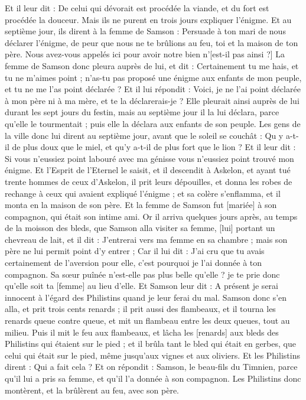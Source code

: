\begin{multicols}{2}
Et il leur dit : De celui qui dévorait est procédée la viande, et du fort est procédée la douceur. Mais ils ne purent en trois jours expliquer l'énigme.
Et au septième jour, ils dirent à la femme de Samson : Persuade à ton mari de nous déclarer l'énigme, de peur que nous ne te brûlions au feu, toi et la maison de ton père. Nous avez-vous appelés ici pour avoir notre bien n'[est-il pas ainsi ?]
La femme de Samson donc pleura auprès de lui, et dit : Certainement tu me hais, et tu ne m'aimes point ; n'as-tu pas proposé une énigme aux enfants de mon peuple, et tu ne me l'as point déclarée ? Et il lui répondit : Voici, je ne l'ai point déclarée à mon père ni à ma mère, et te la déclarerais-je ?
Elle pleurait ainsi auprès de lui durant les sept jours du festin, mais au septième jour il la lui déclara, parce qu'elle le tourmentait ; puis elle la déclara aux enfants de son peuple.
Les gens de la ville donc lui dirent au septième jour, avant que le soleil se couchât : Qu y a-t-il de plus doux que le miel, et qu'y a-t-il de plus fort que le lion ? Et il leur dit : Si vous n'eussiez point labouré avec ma génisse vous n'eussiez point trouvé mon énigme.
Et l'Esprit de l'Eternel le saisit, et il descendit à Askelon, et ayant tué trente hommes de ceux d'Askelon, il prit leurs dépouilles, et donna les robes de rechange à ceux qui avaient expliqué l'énigme ; et sa colère s'enflamma, et il monta en la maison de son père.
Et la femme de Samson fut [mariée] à son compagnon, qui était son intime ami.
\VerseOne{}Or il arriva quelques jours après, au temps de la moisson des bleds, que Samson alla visiter sa femme, [lui] portant un chevreau de lait, et il dit : J'entrerai vers ma femme en sa chambre ; mais son père ne lui permit point d'y entrer ;
Car il lui dit : J'ai cru que tu avais certainement de l'aversion pour elle, c'est pourquoi je l'ai donnée à ton compagnon. Sa sœur puînée n'est-elle pas plus belle qu'elle ? je te prie donc qu'elle soit ta [femme] au lieu d'elle.
Et Samson leur dit : A présent je serai innocent à l'égard des Philistins quand je leur ferai du mal.
Samson donc s'en alla, et prit trois cents renards ; il prit aussi des flambeaux, et il tourna les renards queue contre queue, et mit un flambeau entre les deux queues, tout au milieu.
Puis il mit le feu aux flambeaux, et lâcha les [renards] aux bleds des Philistins qui étaient sur le pied ; et il brûla tant le bled qui était en gerbes, que celui qui était sur le pied, même jusqu'aux vignes et aux oliviers.
Et les Philistins dirent : Qui a fait cela ? Et on répondit : Samson, le beau-fils du Timnien, parce qu'il lui a pris sa femme, et qu'il l'a donnée à son compagnon. Les Philistins donc montèrent, et la brûlèrent au feu, avec son père.

\end{multicols}
